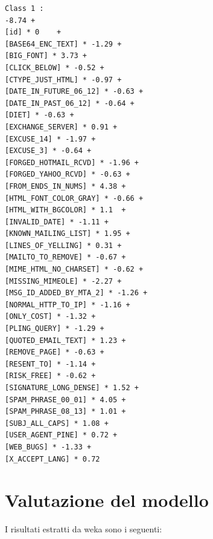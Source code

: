 \begin{lstlisting}
Class 1 :
-8.74 + 
[id] * 0    +
[BASE64_ENC_TEXT] * -1.29 +
[BIG_FONT] * 3.73 +
[CLICK_BELOW] * -0.52 +
[CTYPE_JUST_HTML] * -0.97 +
[DATE_IN_FUTURE_06_12] * -0.63 +
[DATE_IN_PAST_06_12] * -0.64 +
[DIET] * -0.63 +
[EXCHANGE_SERVER] * 0.91 +
[EXCUSE_14] * -1.97 +
[EXCUSE_3] * -0.64 +
[FORGED_HOTMAIL_RCVD] * -1.96 +
[FORGED_YAHOO_RCVD] * -0.63 +
[FROM_ENDS_IN_NUMS] * 4.38 +
[HTML_FONT_COLOR_GRAY] * -0.66 +
[HTML_WITH_BGCOLOR] * 1.1  +
[INVALID_DATE] * -1.11 +
[KNOWN_MAILING_LIST] * 1.95 +
[LINES_OF_YELLING] * 0.31 +
[MAILTO_TO_REMOVE] * -0.67 +
[MIME_HTML_NO_CHARSET] * -0.62 +
[MISSING_MIMEOLE] * -2.27 +
[MSG_ID_ADDED_BY_MTA_2] * -1.26 +
[NORMAL_HTTP_TO_IP] * -1.16 +
[ONLY_COST] * -1.32 +
[PLING_QUERY] * -1.29 +
[QUOTED_EMAIL_TEXT] * 1.23 +
[REMOVE_PAGE] * -0.63 +
[RESENT_TO] * -1.14 +
[RISK_FREE] * -0.62 +
[SIGNATURE_LONG_DENSE] * 1.52 +
[SPAM_PHRASE_00_01] * 4.05 +
[SPAM_PHRASE_08_13] * 1.01 +
[SUBJ_ALL_CAPS] * 1.08 +
[USER_AGENT_PINE] * 0.72 +
[WEB_BUGS] * -1.33 +
[X_ACCEPT_LANG] * 0.72
\end{lstlisting}
	
\section{Valutazione del modello}

I risultati estratti da weka sono i seguenti: 

